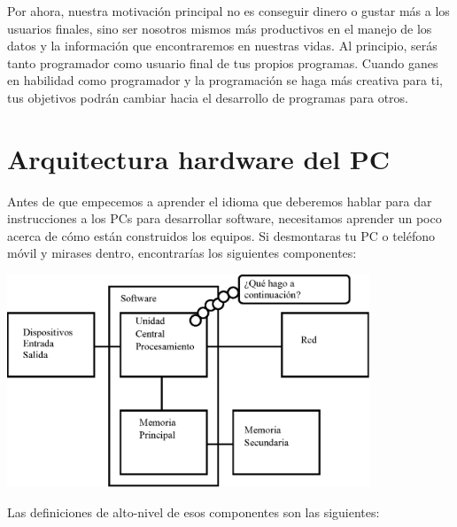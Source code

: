 Por ahora, nuestra motivación principal no es conseguir dinero o gustar más a los usuarios
finales, sino ser nosotros mismos más productivos en el manejo de los datos y la
información que encontraremos en nuestras vidas.
Al principio, serás tanto programador como usuario final de tus propios programas.
Cuando ganes en habilidad como programador y la programación se haga más creativa para ti,
tus objetivos podrán cambiar hacia el desarrollo de programas para otros.

\section{Arquitectura hardware del PC}

Antes de que empecemos a aprender el idioma que deberemos hablar
para dar instrucciones a los PCs para desarrollar
software, necesitamos aprender un poco acerca de cómo
están construidos los equipos. Si desmontaras
tu PC o teléfono móvil y mirases dentro,
encontrarías los siguientes componentes:

\beforefig
\centerline{\includegraphics[height=2.50in]{figs2/arch.eps}}
\afterfig

Las definiciones de alto-nivel de esos componentes son las siguientes:

